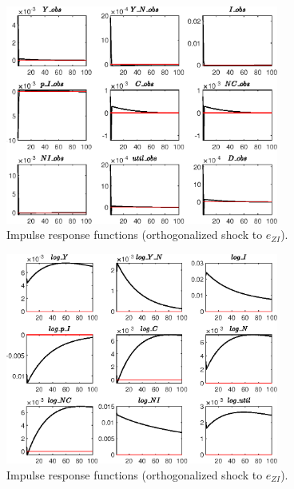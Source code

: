 \begin{figure}[H]
\centering 
\includegraphics[width=0.80\textwidth]{BRS_growth_util/graphs/BRS_growth_util_IRF_e_ZI1}
\caption{Impulse response functions (orthogonalized shock to ${e_{ZI}}$).}\label{Fig:IRF:e_ZI:1}
\end{figure}
 
\begin{figure}[H]
\centering 
\includegraphics[width=0.80\textwidth]{BRS_growth_util/graphs/BRS_growth_util_IRF_e_ZI2}
\caption{Impulse response functions (orthogonalized shock to ${e_{ZI}}$).}\label{Fig:IRF:e_ZI:2}
\end{figure}
 
